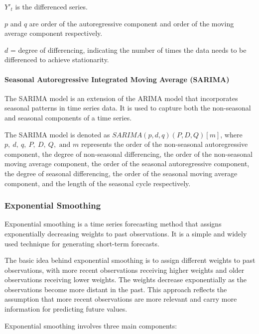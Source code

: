 \documentclass[
]{article}
\begin{document}
\({Y'}_{t}\) is the differenced series.

\(p\) and \(q\) are order of the autoregressive component and order of
the moving average component respectively.

\(d\) = degree of differencing, indicating the number of times the data
needs to be differenced to achieve stationarity.

\hypertarget{seasonal-autoregressive-integrated-moving-average-sarima}{%
\paragraph{Seasonal Autoregressive Integrated Moving Average
(SARIMA)}\label{seasonal-autoregressive-integrated-moving-average-sarima}}

The SARIMA model is an extension of the ARIMA model that incorporates
seasonal patterns in time series data. It is used to capture both the
non-seasonal and seasonal components of a time series.

The SARIMA model is denoted as \(SARIMA(p, d, q)(P, D, Q)[m]\), where
\(p,\ d,\ q,\ P,\ D,\ Q, \text{ and }m\) represents the order of the
non-seasonal autoregressive component, the degree of non-seasonal
differencing, the order of the non-seasonal moving average component,
the order of the seasonal autoregressive component, the degree of
seasonal differencing, the order of the seasonal moving average
component, and the length of the seasonal cycle respectively.

\hypertarget{exponential-smoothing}{%
\subsubsection{Exponential Smoothing}\label{exponential-smoothing}}

Exponential smoothing is a time series forecasting method that assigns
exponentially decreasing weights to past observations. It is a simple
and widely used technique for generating short-term forecasts.

The basic idea behind exponential smoothing is to assign different
weights to past observations, with more recent observations receiving
higher weights and older observations receiving lower weights. The
weights decrease exponentially as the observations become more distant
in the past. This approach reflects the assumption that more recent
observations are more relevant and carry more information for predicting
future values.

Exponential smoothing involves three main components:
\end{document}
